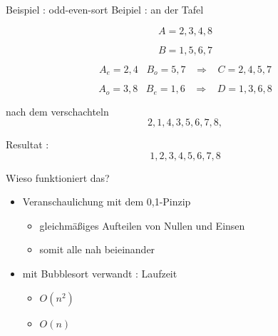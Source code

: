 \documentclass[ucs,9pt]{beamer}
\begin{document}
\begin{frame}{Beispiel : odd-even-sort}
Beipiel : an der Tafel\\
\begin{itemize}
\item[] $$ A = 2,3,4,8 $$
\item[] $$ B = 1,5,6,7 $$
 {\item[] $$ A_e = 2,4 \;\;\; B_o = 5,7 \;\;\; \Rightarrow \;\;\; C= 2,4,5,7 $$}
 {\item[] $$ A_o = 3,8 \;\;\; B_e = 1,6 \;\;\; \Rightarrow \;\;\; D = 1,3,6,8 $$}
 {\item[] nach dem verschachteln $$ 2,1,4,3,5,6,7,8,$$}
 {\item[] Resultat : $$1,2,3,4,5,6,7,8$$}
\end{itemize}
\end{frame}

\begin{frame}{Wieso funktioniert das?}
\begin{itemize}
\item Veranschaulichung mit dem 0,1-Pinzip
	\begin{itemize}
		\item gleichmäßiges Aufteilen von Nullen und Einsen
		\item somit alle nah beieinander
	\end{itemize}
\item mit Bubblesort verwandt : Laufzeit \\
\begin{itemize}
\item[worst : ] $O(n^2)$
\item[best  : ] $O(n)$
\end{itemize}

\end{itemize}
\end{frame}
\end{document}
